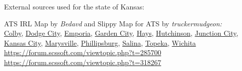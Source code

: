 
















\vspace{2em}\footnoterule
{\footnotesize \noindent External sources used for the state of Kansas:
\begin{description}[
style=nextline,
leftmargin=1.1em,
labelsep=0pt,
parsep=0pt,
font=\normalfont,
]

\item[$\ast$]
ATS IRL Map by \textit{Bedavd} and Slippy Map for ATS by \textit{truckermudgeon:}\\
\hyperref[city:Colby]{Colby},
\hyperref[city:Dodge City]{Dodge City},
\hyperref[city:Emporia]{Emporia},
\hyperref[city:Garden City]{Garden City},
\hyperref[city:Hays]{Hays},
\hyperref[city:Hutchinson]{Hutchinson},
\hyperref[city:Junction City]{Junction City},
\hyperref[city:kansas_ci_ks]{Kansas City},
\hyperref[city:Marysville]{Marysville},
\hyperref[city:Phillipsburg]{Phillipsburg},
\hyperref[city:salina_ks]{Salina},
\hyperref[city:Topeka]{Topeka},
\hyperref[city:Wichita]{Wichita}
\\ \url{https://forum.scssoft.com/viewtopic.php?t=285700}
\\ \url{https://forum.scssoft.com/viewtopic.php?t=318267}

\end{description}
}
